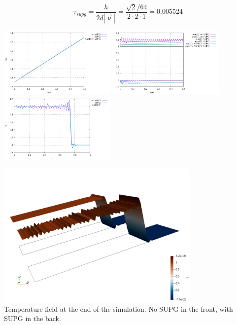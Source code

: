 


\[
\tau_{supg} = \frac{h}{2 d |\vec{\upnu}|} = \frac{\sqrt{2}/64}{2 \cdot 2 \cdot 1} = 0.005524
\]

\begin{center}
\includegraphics[width=5.7cm]{python_codes/fieldstone_43/results/experiment3/Q2/avrg_T.pdf}
\includegraphics[width=5.7cm]{python_codes/fieldstone_43/results/experiment3/Q2/stats_T.pdf}
\includegraphics[width=5.7cm]{python_codes/fieldstone_43/results/experiment3/Q2/temperature.pdf}
\end{center}


\begin{center}
\includegraphics[width=10cm]{python_codes/fieldstone_43/results/experiment3/Q2/compT}\\
{\captionfont Temperature field at the end of the simulation. No SUPG in the front, 
with SUPG in the back.}
\end{center}






